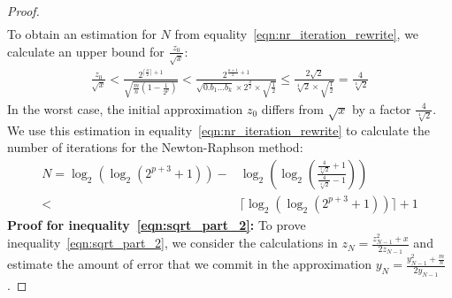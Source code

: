 \documentclass{article}
\newcommand{\sqrtexp}{\log_2(\log_2(2^{p+3}+1))}
\numberwithin{mytheorem}{section}
\begin{document}
\begin{proof}
\begin{align*}
\end{align*}
To obtain an estimation for $N$ from equality~\eqref{eqn:nr_iteration_rewrite}, we calculate an upper bound for $\frac{z_0}{\sqrt{x}}$:
\begin{align*}
\frac{z_0}{\sqrt{x}}<\frac{2^{\lceil \frac{a}{2} \rceil+1}}{\sqrt{\frac{m}{n}(1-\frac{1}{2^{p}})}}<\frac{2^{\frac{a+1}{2} +1}}{\sqrt{0.b_1\ldots b_k}\times 2^{\frac{a}{2}}\times \sqrt{\frac{1}{2}}}\leq \frac{2\sqrt{2}}{\sqrt[4]{2}\times\sqrt{\frac{1}{2}}}=\frac{4}{\sqrt[4]{2}}
\end{align*}
In the worst case, the initial approximation $z_0$ differs from $\sqrt{x}$ by a factor $\frac{4}{\sqrt[4]{2}}$. We use this estimation in equality~\eqref{eqn:nr_iteration_rewrite} to calculate the number of iterations for the Newton-Raphson method:
\begin{align}
N=\log_2 (\log_2 (2^{p+3}+1))-& \log_2 (\log_2 (\frac{\frac{4}{\sqrt[4]{2}}+1}{\frac{4}{\sqrt[4]{2}}-1}))\nonumber\\
<& \lceil\sqrtexp \rceil+1\label{eqn:n_upper}
\end{align}
\textbf{Proof for inequality~\eqref{eqn:sqrt_part_2}:} To prove inequality~\eqref{eqn:sqrt_part_2}, we consider the calculations in $z_N=\frac{z_{N-1}^2+x}{2z_{N-1}}$ and estimate the amount of error that we commit in the approximation $y_N=\frac{y_{N-1}^2+\frac{m}{n}}{2y_{N-1}}$. 


\end{proof}
\end{document}

